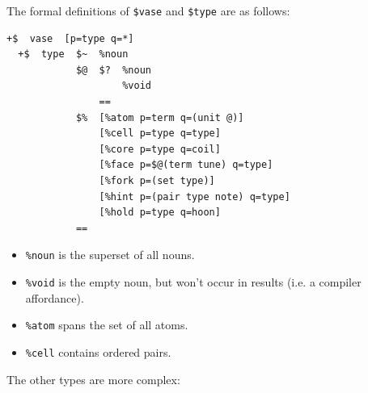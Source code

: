 \documentclass[twoside]{article}
\begin{document}
The formal definitions of \lstinline[style=inlinecode]{$vase} and \lstinline[style=inlinecode]{$type} are as follows:

\begin{lstlisting}[style=listingcode]
  +$  vase  [p=type q=*]
  +$  type  $~  %noun
            $@  $?  %noun
                    %void
                ==
            $%  [%atom p=term q=(unit @)]
                [%cell p=type q=type]
                [%core p=type q=coil]
                [%face p=$@(term tune) q=type]
                [%fork p=(set type)]
                [%hint p=(pair type note) q=type]
                [%hold p=type q=hoon]
            ==
\end{lstlisting}

\begin{itemize}
  \item  \lstinline[style=inlinecode]{%noun} is the superset of all nouns.
  \item  \lstinline[style=inlinecode]{%void} is the empty noun, but won't occur in results (i.e. a compiler affordance).
  \item  \lstinline[style=inlinecode]{%atom} spans the set of all atoms.
  \item  \lstinline[style=inlinecode]{%cell} contains ordered pairs.
\end{itemize}

\noindent
The other types are more complex:
\end{document}
